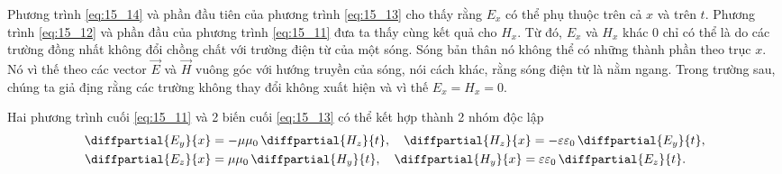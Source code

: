 \noindent
Phương trình \eqref{eq:15_14} và phần đầu tiên của phương trình \eqref{eq:15_13} cho thấy rằng $E_x$ có thể phụ thuộc trên cả $x$ và trên $t$.
Phương trình \eqref{eq:15_12} và phần đầu của phương trình \eqref{eq:15_11} đưa ta thấy cùng kết quả cho $H_x$.
Từ đó, $E_x$ và $H_x$ khác 0 chỉ có thể là do các trường đồng nhất không đổi chồng chất với trường điện từ của một sóng. 
Sóng bản thân nó không thể có những thành phần theo trục $x$.
Nó vì thế theo các vector $\vec{E}$ và $\vec{H}$ vuông góc với hướng truyền của sóng, nói cách khác, rằng sóng điện từ là nằm ngang.
Trong trường sau, chúng ta giả địng rằng các trường không thay đổi không xuất hiện và vì thế $E_x=H_x=0$.

Hai phương trình cuối \eqref{eq:15_11} và 2 biến cuối \eqref{eq:15_13} có thể kết hợp thành 2 nhóm độc lập
\begin{align}
    \diffpartial{E_y}{x} &= -\mu\mu_0\, \diffpartial{H_z}{t},\quad \diffpartial{H_z}{x} = -\varepsilon\varepsilon_0\, \diffpartial{E_y}{t}, \label{eq:15_15} \\
    \diffpartial{E_z}{x} &= \mu\mu_0\, \diffpartial{H_y}{t},\quad \diffpartial{H_y}{x} = \varepsilon\varepsilon_0\, \diffpartial{E_z}{t}. \label{eq:15_16}
\end{align}

\noindent

